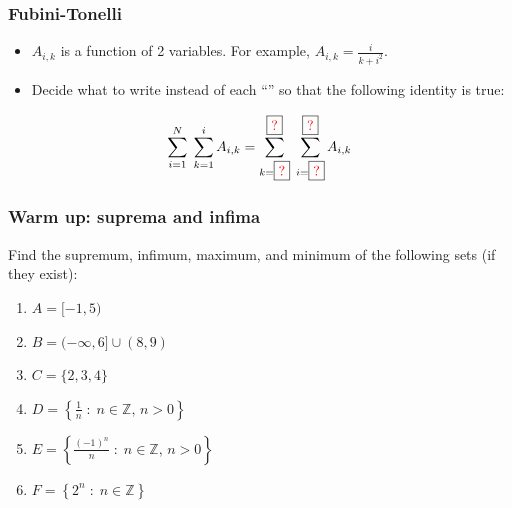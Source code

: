 \documentclass[14pt]{beamer}
\begin{document}
	\begin{frame}[t]
		\fontsize{13}{13}\selectfont
		\frametitle{Fubini-Tonelli}

		\begin{itemize}
			\item $A_{i,k}$ is a function of 2 variables. \; For example, $\displaystyle
				A_{i,k}= \frac{i}{k+i^{2}}$.

			\item Decide what to write instead of each ``''
				so that the following identity is true:
		\end{itemize}

		{\fontsize{20}{20}\selectfont \begin{equation*}\sum_{i=1}^{N}\; \sum_{k=1}^{i}A_{i, k}= \sum_{k = \boxed{{\color{red} ?}}}^{\boxed{{\color{red} ?}}}\; \sum_{i=\boxed{{\color{red} ?}}}^{\boxed{{\color{red} ?}}}A_{i,k}\end{equation*} }
	\end{frame}





	\begin{frame}[t]
		\fontsize{13}{13}\selectfont
		\frametitle{Warm up: suprema and infima}

		Find the supremum, infimum, maximum, and minimum of the following sets (if they
		exist):

		\begin{enumerate}
			\vfill

			\item $\displaystyle A = [-1,5)$
				\vfill

			\item $\displaystyle B = (-\infty,6] \cup (8, 9)$
				\vfill

			\item $\displaystyle C = \{ 2, 3, 4\}$
				\vfill

			\item $\displaystyle D = \left\{ \frac{1}{n}\; : \; n \in \mathbb{Z}, \, n
				>0 \right\}$
				\vfill

			\item $\displaystyle E = \left\{ \frac{(-1)^{n}}{n}\; : \; n \in \mathbb{Z}
				, \, n >0 \right\}$
				\vfill

			\item $\displaystyle F = \left\{ 2^{n}\; : \; n \in \mathbb{Z}\right\}$
				\vfill
		\end{enumerate}
	\end{frame}
\end{document}
